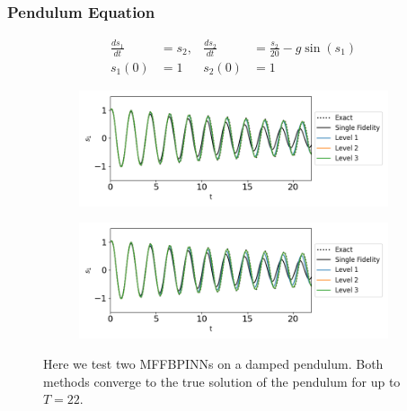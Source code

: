 \documentclass[12pt]{article}
\begin{document}
\subsubsection{Pendulum Equation}
\begin{align*}
\frac{d s_1}{dt} &= s_2, & \frac{d s_2}{dt} &= \frac{s_2}{20} - g \sin{(s_1)} \\
s_1(0) &= 1 & s_2(0) &= 1
\end{align*}
\begin{figure}[htpb]
    \centering
    \begin{subfigure}{0.49\textwidth}
        \includegraphics[width=\linewidth]{imgs/MF_loop_s1_dd}
        \caption{}
        \label{subfig:a}
    \end{subfigure}
    \hfill %
    \begin{subfigure}{0.49\textwidth}
        \includegraphics[width=\linewidth]{imgs/MF_loop_s1}
        \caption{}
        \label{subfig:b}
    \end{subfigure}
	\caption{Here we test two MFFBPINNs on a damped pendulum. Both methods converge to the true solution of the pendulum for up to $T=22$.}
	\label{fig:pend_res}
\end{figure}
\end{document}
